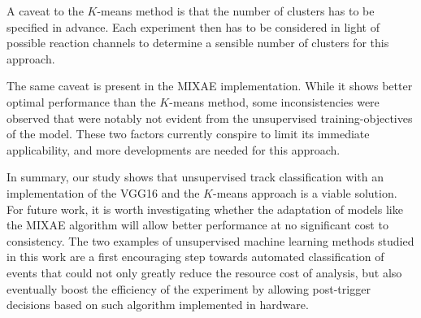 \documentclass[review,sort&compress]{elsarticle}
\begin{document}
A caveat to the $K$-means method is that the number of clusters has to be specified in advance. Each experiment then has to be considered in light of possible reaction channels to determine a sensible number of clusters for this approach. 

The same caveat is present in the MIXAE implementation. While it shows better optimal performance than the $K$-means method, some inconsistencies were observed that were notably not evident from the unsupervised training-objectives of the model. These two factors currently conspire to limit its immediate applicability, and more developments are needed for this approach. 

In summary, our study shows that unsupervised track classification with an implementation of the VGG16 and the  $K$-means approach is a viable solution. For future work, it is worth investigating whether the adaptation of  models like the MIXAE algorithm will allow better performance at no significant cost to consistency.  
The two examples of unsupervised machine learning methods studied in this work are a first encouraging step towards automated classification of events that could not only greatly reduce the resource cost of analysis, but also eventually boost the efficiency of the experiment by allowing post-trigger decisions based on such algorithm implemented in hardware. %

\end{document}
